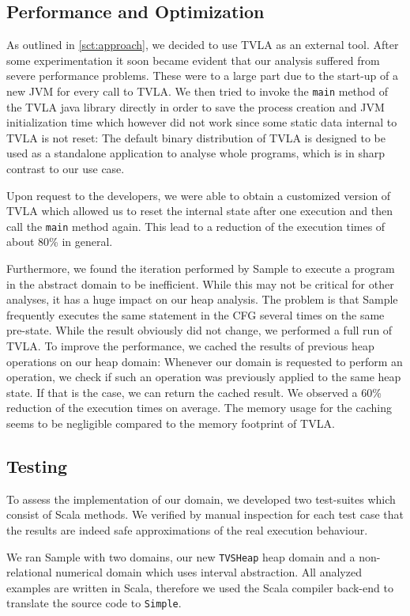 \documentclass[11pt,a4paper,english]{article}
\begin{document}
\subsection{Performance and Optimization}
As outlined in \autoref{sct:approach}, we decided to use TVLA as an external
tool. After some experimentation it soon became evident that our analysis
suffered from severe performance problems. These were to a large part due to the
start-up of a new JVM for every call to TVLA. We then tried to invoke the
\texttt{main} method of the TVLA java library directly in order to save the
process creation and JVM initialization time which however did not work since
some static data internal to TVLA is not reset: The default binary distribution
of TVLA is designed to be used as a standalone application to analyse whole
programs, which is in sharp contrast to our use case. 

Upon request to the developers, we were able to obtain a customized version of
TVLA which allowed us to reset the internal state after one execution and then
call the \texttt{main} method again. This lead to a reduction of the execution
times of about 80\% in general.

Furthermore, we found the iteration performed by Sample to execute a program in
the abstract domain to be inefficient. While this may not be critical for other
analyses, it has a huge impact on our heap analysis. The problem is that Sample
frequently executes the same statement in the CFG several times on the same
pre-state. While the result obviously did not change, we performed a full run of
TVLA. To improve the performance, we cached the results of previous heap
operations on our heap domain: Whenever our domain is requested to perform an
operation, we check if such an operation was previously applied to the same heap
state. If that is the case, we can return the cached result. We observed a 
60\% reduction of the execution times on average. The memory usage for the caching seems to be
negligible compared to the memory footprint of TVLA.


\subsection{Testing}  
To assess the implementation of our domain, we developed two test-suites which
consist of Scala methods. We verified by manual inspection for each test case that
the results are indeed safe approximations of the real execution behaviour.

We ran Sample with two domains, our new \texttt{TVSHeap} heap domain and a
non-relational numerical domain which uses interval abstraction. All analyzed
examples are written in Scala, therefore we used the Scala compiler back-end to
translate the source code to \texttt{Simple}.
\end{document}
